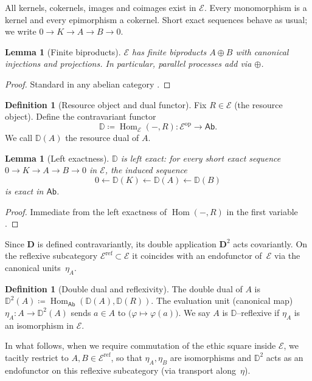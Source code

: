 \documentclass[12pt]{article}
\newcommand{\E}{\mathcal{E}}
\newcommand{\Ab}{\mathsf{Ab}}
\newcommand{\DD}{\mathbb{D}}
\newcommand{\Hom}{\operatorname{Hom}}
\newcommand{\op}{\mathrm{op}}
\theoremstyle{plain}
\newtheorem{lemma}[theorem]{Lemma}
\theoremstyle{definition}
\newtheorem{definition}[theorem]{Definition}
\theoremstyle{remark}
\numberwithin{equation}{section}
\begin{document}
All kernels, cokernels, images and coimages exist in \(\E\). Every monomorphism is a kernel and every epimorphism a cokernel. Short exact sequences behave as usual; we write \(0\to K\to A\to B\to 0\).

\begin{lemma}[Finite biproducts]
\(\E\) has finite biproducts \(A\oplus B\) with canonical injections and projections. In particular, parallel processes add via \(\oplus\).
\end{lemma}

\begin{proof}
Standard in any abelian category \cite{MacLane1998}.
\end{proof}

\begin{definition}[Resource object and dual functor]
Fix \(R\in \E\) (the resource object). Define the contravariant functor
\[
\DD \coloneqq \Hom_{\E}(-,R): \E^{\op}\longrightarrow \Ab.
\]
We call \(\DD(A)\) the resource dual of \(A\).
\end{definition}

\begin{lemma}[Left exactness]\label{lem:left-exact}
\(\DD\) is left exact: for every short exact sequence \(0\to K\to A\to B\to 0\) in \(\E\), the induced sequence
\[
0 \leftarrow \DD(K) \xleftarrow{} \DD(A) \xleftarrow{} \DD(B)
\]
is exact in \(\Ab\).
\end{lemma}

\begin{proof}
Immediate from the left exactness of \(\Hom(-,R)\) in the first variable \cite{Weibel1994}.
\end{proof}

Since $\mathbf D$ is defined contravariantly,
its double application $\mathbf D^2$ acts covariantly.
On the reflexive subcategory $\E^{\mathrm{ref}}\subset\E$
it coincides with an endofunctor of~$\E$ via the canonical units~$\eta_A$.

\begin{definition}[Double dual and reflexivity]
The double dual of \(A\) is \(\DD^2(A)\coloneqq \Hom_{\Ab}(\DD(A),\DD(R))\).
The evaluation unit (canonical map) \(\eta_A: A\to \DD^2(A)\) sends \(a\in A\) to \(\big(\varphi\mapsto \varphi(a)\big)\).
We say \(A\) is \(\DD\)--reflexive if \(\eta_A\) is an isomorphism in \(\E\).
\end{definition}

In what follows, when we require commutation of the ethic square inside $\E$, we tacitly restrict to $A,B\in \E^{\mathrm{ref}}$, so that $\eta_A,\eta_B$ are isomorphisms and $\DD^2$ acts as an endofunctor on this reflexive subcategory (via transport along~$\eta$).
\end{document}
